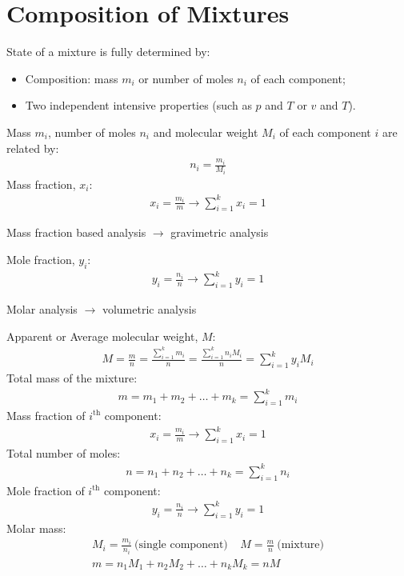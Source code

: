 \documentclass[class=report, crop=false, 12pt,a4paper]{standalone}
\numberwithin{equation}{section}
\begin{document}
\section{Composition of Mixtures}
State of a mixture is fully determined by:
\begin{itemize}
  \item Composition: mass $m_i$ or number of moles $n_i$ of each component;
  \item Two independent intensive properties (such as $p$ and $T$ or $v$ and $T$).  
\end{itemize}
Mass $m_i$, number of moles $n_i$ and molecular weight $M_i$ of each component $i$ are related by:
\begin{gather}
  n_i = \frac{m_i}{M_i}
\end{gather}
Mass fraction, $x_i$:
\begin{gather}
  x_i = \frac{m_i}{m} \longrightarrow \sum_{i=1}^{k}x_i = 1
\end{gather}
\begin{center}
  Mass fraction based analysis $\longrightarrow$ gravimetric analysis
\end{center}
Mole fraction, $y_i$:
\begin{gather}
  y_i = \frac{n_i}{n} \longrightarrow \sum_{i=1}^{k}y_i = 1
\end{gather}
\begin{center}
  Molar analysis $\longrightarrow$ volumetric analysis
\end{center}
Apparent or Average molecular weight, $M$:
\begin{gather}
  M = \frac{m}{n} = \frac{\sum_{i=1}^{k}m_i}{n} = \frac{\sum_{i=1}^{k}n_i M_i}{n} = \sum_{i=1}^{k}y_i M_i
\end{gather}
Total mass of the mixture: 
\begin{gather}
  m = m_1 + m_2 + \dots + m_k = \sum_{i=1}^{k}m_i
\end{gather}
Mass fraction of $i^{\text{th}}$ component:
\begin{gather}
  x_i = \frac{m_i}{m} \longrightarrow \sum_{i=1}^{k}x_i = 1
\end{gather}
Total number of moles:
\begin{gather}
  n = n_1 + n_2 + \dots + n_k = \sum_{i=1}^{k}n_i
\end{gather}
Mole fraction of $i^{\text{th}}$ component:
\begin{gather}
  y_i = \frac{n_i}{n} \longrightarrow \sum_{i=1}^{k}y_i = 1
\end{gather}
Molar mass: 
\begin{gather}
  M_i = \frac{m_i}{n_i} \ \text{(single component)} \ \ \ \ \ M = \frac{m}{n} \ \text{(mixture)} \\[5pt]
  m = n_1M_1 + n_2M_2 + \dots + n_kM_k = nM
\end{gather}
\end{document}
